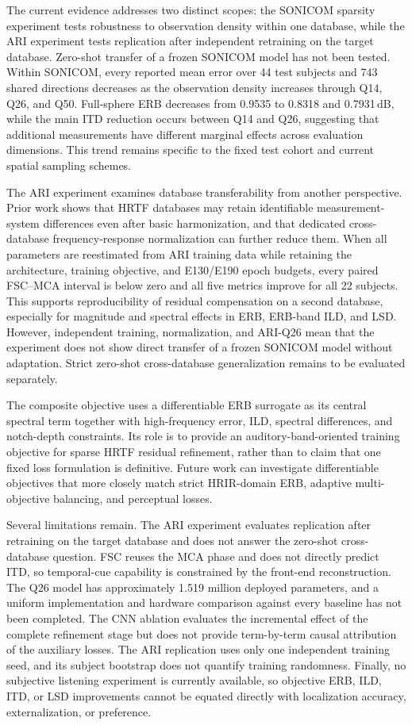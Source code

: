 \documentclass[UTF8,a4paper]{article}
\begin{document}
The current evidence addresses two distinct scopes: the SONICOM sparsity experiment tests robustness to observation density within one database, while the ARI experiment tests replication after independent retraining on the target database. Zero-shot transfer of a frozen SONICOM model has not been tested. Within SONICOM, every reported mean error over 44 test subjects and 743 shared directions decreases as the observation density increases through Q14, Q26, and Q50. Full-sphere ERB decreases from 0.9535 to 0.8318 and 0.7931\,dB, while the main ITD reduction occurs between Q14 and Q26, suggesting that additional measurements have different marginal effects across evaluation dimensions. This trend remains specific to the fixed test cohort and current spatial sampling schemes.

The ARI experiment examines database transferability from another perspective. Prior work shows that HRTF databases may retain identifiable measurement-system differences even after basic harmonization, and that dedicated cross-database frequency-response normalization can further reduce them\cite{R24,R25}. When all parameters are reestimated from ARI training data while retaining the architecture, training objective, and E130/E190 epoch budgets, every paired FSC--MCA interval is below zero and all five metrics improve for all 22 subjects. This supports reproducibility of residual compensation on a second database, especially for magnitude and spectral effects in ERB, ERB-band ILD, and LSD. However, independent training, normalization, and ARI-Q26 mean that the experiment does not show direct transfer of a frozen SONICOM model without adaptation. Strict zero-shot cross-database generalization remains to be evaluated separately.

The composite objective uses a differentiable ERB surrogate as its central spectral term together with high-frequency error, ILD, spectral differences, and notch-depth constraints. Its role is to provide an auditory-band-oriented training objective for sparse HRTF residual refinement, rather than to claim that one fixed loss formulation is definitive. Future work can investigate differentiable objectives that more closely match strict HRIR-domain ERB, adaptive multi-objective balancing, and perceptual losses.

Several limitations remain. The ARI experiment evaluates replication after retraining on the target database and does not answer the zero-shot cross-database question. FSC reuses the MCA phase and does not directly predict ITD, so temporal-cue capability is constrained by the front-end reconstruction. The Q26 model has approximately 1.519 million deployed parameters, and a uniform implementation and hardware comparison against every baseline has not been completed. The CNN ablation evaluates the incremental effect of the complete refinement stage but does not provide term-by-term causal attribution of the auxiliary losses. The ARI replication uses only one independent training seed, and its subject bootstrap does not quantify training randomness. Finally, no subjective listening experiment is currently available, so objective ERB, ILD, ITD, or LSD improvements cannot be equated directly with localization accuracy, externalization, or preference.
\end{document}

